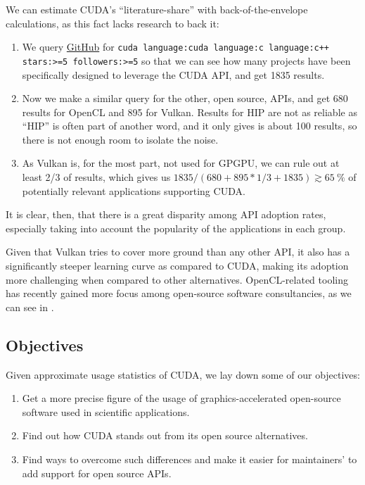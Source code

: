 \documentclass[conference, onecolumn]{IEEEtran}
\begin{document}

We can estimate CUDA's ``literature-share'' with back-of-the-envelope
calculations, as this fact lacks research to back it:

\begin{enumerate}
    \item We query \href{https://github.com}{GitHub} for
        \verb|cuda language:cuda language:c language:c++ stars:>=5 followers:>=5|
        so that we can see how many projects have been specifically designed to
        leverage the CUDA API, and get 1835 results.
    \item Now we make a similar query for the other, open source, APIs, and get
        680 results for OpenCL and 895 for Vulkan. Results for HIP are not as
        reliable as ``HIP'' is often part of another word, and it only gives is
        about 100 results, so there is not enough room to isolate the noise.
    \item As Vulkan is, for the most part, not used for GPGPU, we can rule out
        at least 2/3 of results, which gives us $ 1835 / (680 + 895 * 1/3 +
        1835) \gtrsim \qty{65}{\percent} $ of potentially relevant applications
        supporting CUDA.
\end{enumerate}

It is clear, then, that there is a great disparity among API adoption rates,
especially taking into account the popularity of the applications in each
group.

Given that Vulkan tries to cover more ground than any other API, it also has a
significantly steeper learning curve as compared to CUDA, making its adoption
more challenging when compared to other alternatives.
OpenCL-related tooling has recently gained more focus among open-source
software consultancies, as we can see in \cite{MachineL70:online}.

\subsection{Objectives} \label{sec:intro:objectives}

Given approximate usage statistics of CUDA, we lay down some of our objectives:

\begin{enumerate}
    \item\label{obj1} Get a more precise figure of the usage of
        graphics-accelerated open-source software used in scientific
        applications.
    \item\label{obj2} Find out how CUDA stands out from its open source
        alternatives.
    \item\label{obj3} Find ways to overcome such differences and make it easier
        for maintainers' to add support for open source APIs.
\end{enumerate}
\end{document}
